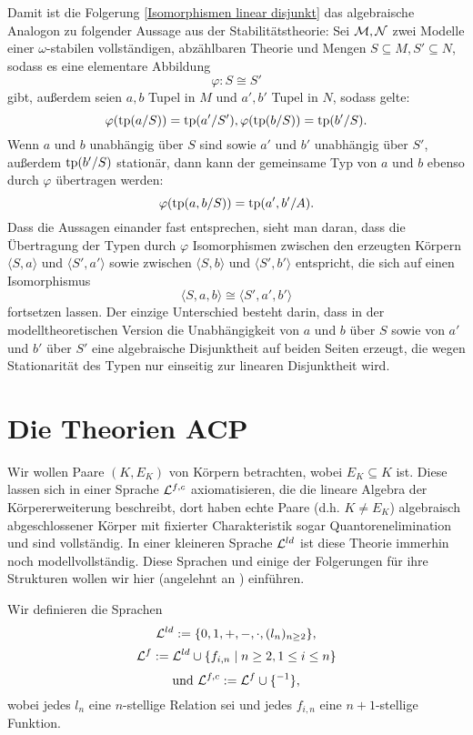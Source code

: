     \begin{remark}
    	Damit ist die Folgerung \ref{Isomorphismen linear disjunkt} das algebraische Analogon zu folgender Aussage aus der Stabilitätstheorie: Sei $\mathcal{M},\mathcal{N}$ zwei Modelle einer $\omega$-stabilen vollständigen, abzählbaren Theorie und Mengen $S\subseteq M,S'\subseteq N$, sodass es eine elementare Abbildung $$\varphi:S\cong S'$$ gibt, außerdem seien $a,b$ Tupel in $M$ und $a',b'$ Tupel in $N$, sodass gelte: $$\varphi(\operatorname{tp}(a/S))=\operatorname{tp}(a'/S'),\varphi(\operatorname{tp}(b/S))=\operatorname{tp}(b'/S).$$
    	Wenn $a$ und $b$ unabhängig über $S$ sind sowie $a'$ und $b'$ unabhängig über $S'$, außerdem $\operatorname{tp}(b'/S)$ stationär, dann kann der gemeinsame Typ von $a$ und $b$ ebenso durch $\varphi$ übertragen werden: $$\varphi(\operatorname{tp}(a,b/S))=\operatorname{tp}(a',b'/A).$$
    	Dass die Aussagen einander fast entsprechen, sieht man daran, dass die Übertragung der Typen durch $\varphi$ Isomorphismen zwischen den erzeugten Körpern $\langle S,a\rangle$ und $\langle S',a'\rangle$ sowie zwischen $\langle S,b\rangle$ und $\langle S',b'\rangle$ entspricht, die sich auf einen Isomorphismus $$\langle S,a,b\rangle\cong\langle S',a',b'\rangle$$ fortsetzen lassen.\newpage
    	Der einzige Unterschied besteht darin, dass in der modelltheoretischen Version die Unabhängigkeit von $a$ und $b$ über $S$ sowie von $a'$ und $b'$ über $S'$ eine algebraische Disjunktheit auf beiden Seiten erzeugt, die wegen Stationarität des Typen nur einseitig zur linearen Disjunktheit wird.
    \end{remark}

    \section{Die Theorien ACP}
    Wir wollen Paare $(K,E_K)$ von Körpern betrachten, wobei $E_K\subseteq K$ ist. Diese lassen sich in einer Sprache $\mathcal{L}^{f,c}$ axiomatisieren, die die lineare Algebra der Körpererweiterung beschreibt, dort haben echte Paare (d.h. $K\neq E_K$) algebraisch abgeschlossener Körper mit fixierter Charakteristik sogar Quantoren\-elimination und sind vollständig. In einer kleineren Sprache $\mathcal{L}^{ld}$ ist diese Theorie immerhin noch modellvollständig. Diese Sprachen und einige der Folgerungen für ihre Strukturen wollen wir hier (angelehnt an \cite{Delon}) einführen.
    
    \begin{definition}
    	Wir definieren die Sprachen $$\mathcal{L}^{ld}:=\{0,1,+,-,\cdot,(l_n)_{n\geq2}\},$$ $$\mathcal{L}^f:=\mathcal{L}^{ld}\cup\{f_{i,n}\mid n\geq2,1\leq i\leq n\}$$ $$\text{und }\mathcal{L}^{f,c}:=\mathcal{L}^f\cup\{^{-1}\},$$ wobei jedes $l_n$ eine $n$-stellige Relation sei und jedes $f_{i,n}$ eine $n+1$-stellige Funktion.
    \end{definition}
    
